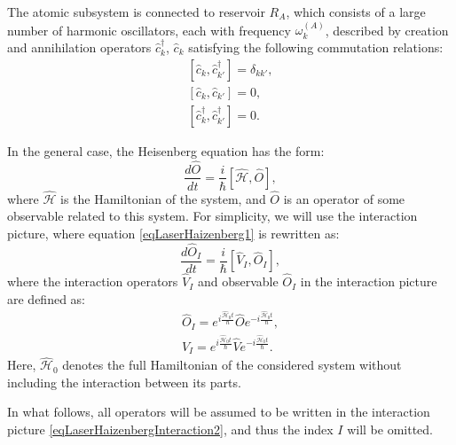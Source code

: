 The atomic subsystem is connected to reservoir $R_A$, which consists of
a large number of harmonic oscillators, each with
frequency $\omega_k^{(A)}$, described by creation and
annihilation operators $\hat{c}_k^{\dag}$, $\hat{c}_k$ satisfying the following
commutation relations:
\begin{eqnarray}
\left[\hat{c}_k, \hat{c}^{\dag}_{k'}\right] = \delta_{kk'},
\nonumber \\
\left[\hat{c}_k, \hat{c}_{k'}\right] = 0,
\nonumber \\
\left[\hat{c}^{\dag}_k, \hat{c}^{\dag}_{k'}\right] = 0.
\nonumber
\end{eqnarray}

In the general case, the Heisenberg equation has the form:
\begin{equation}
\frac{d \hat{O}}{d t} = \frac{i}{\hbar}\left[\hat{\mathcal{H}},
  \hat{O}\right], 
\label{eqLaserHaizenberg1}
\end{equation}
where $\hat{\mathcal{H}}$ is the Hamiltonian of the system, and $\hat{O}$ is an operator
of some observable related to this system. For simplicity,
we will use the interaction picture, where equation
\eqref{eqLaserHaizenberg1} is rewritten as:
\begin{equation}
\frac{d \hat{O}_I}{d t} = \frac{i}{\hbar}\left[\hat{V}_I,
  \hat{O}_I\right], 
\label{eqLaserHaizenbergInteraction1}
\end{equation}
where the interaction operators $\hat{V}_I$ and observable $\hat{O}_I$ in
the interaction picture are defined as: 
\begin{eqnarray}
\hat{O}_I = 
e^{i\frac{\hat{\mathcal{H}}_0t}{\hbar}}
\hat{O}
e^{-i\frac{\hat{\mathcal{H}}_0t}{\hbar}},
\nonumber \\
\hat{V}_I = 
e^{i\frac{\hat{\mathcal{H}}_0t}{\hbar}}
\hat{V}
e^{-i\frac{\hat{\mathcal{H}}_0t}{\hbar}}.
\label{eqLaserHaizenbergInteraction2}
\end{eqnarray}
Here, $\hat{\mathcal{H}}_0$ denotes the full Hamiltonian of the considered system without including
the interaction between its parts.

In what follows, all operators will be assumed to be written in
the interaction picture \eqref{eqLaserHaizenbergInteraction2}, and
thus the index $I$ will be omitted.

